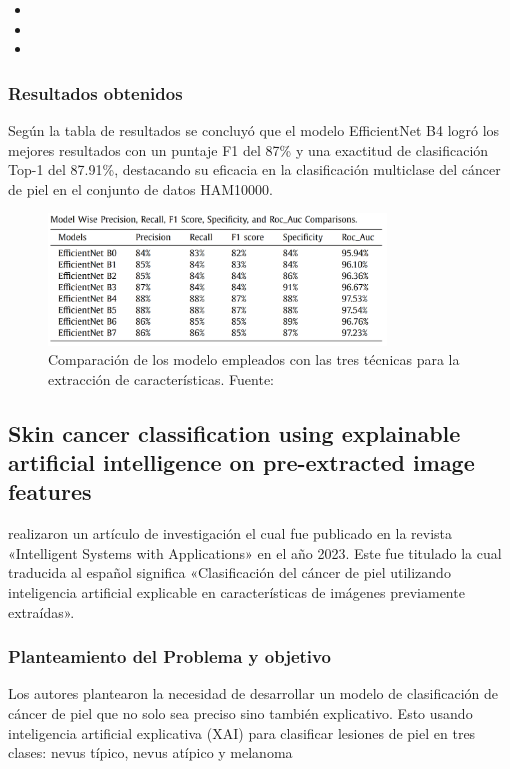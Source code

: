 \begin{itemize}
	\item \MEDMone
	\item \MEDMtwo
	\item \MEDMthree
	
\end{itemize}

\subsubsection{Resultados obtenidos}

Según la tabla de resultados se concluyó que  el modelo EfficientNet B4 logró los mejores resultados con un puntaje F1 del 87\% y una exactitud de clasificación Top-1 del 87.91\%, destacando su eficacia en la clasificación multiclase del cáncer de piel en el conjunto de datos HAM10000.

\begin{figure}[h]
	\begin{center}
		\includegraphics[width=0.8\textwidth]{2/figuras/Multiclass_skin_cancer_imagen_01.png}
		\caption{Comparación de los modelo empleados con las  tres técnicas para la extracción de características. Fuente: \cite{ali_2022multiclass}}
		\label{1:fig 10}
	\end{center}
\end{figure}

\subsection{Skin cancer classification using explainable artificial intelligence on pre-extracted image features \citep*{khater2023skin}}
\citeauthor{khater2023skin} realizaron un artículo de investigación el cual fue publicado en la revista «Intelligent Systems with Applications» en el año 2023. Este fue titulado  la cual traducida al español significa «Clasificación del cáncer de piel utilizando inteligencia artificial explicable en características de imágenes previamente extraídas».

\subsubsection{Planteamiento del Problema y objetivo}
Los autores plantearon la necesidad de desarrollar un modelo de clasificación de cáncer de piel que no solo sea preciso sino también explicativo. Esto usando inteligencia artificial explicativa (XAI) para clasificar lesiones de piel en tres clases: nevus típico, nevus atípico y melanoma


